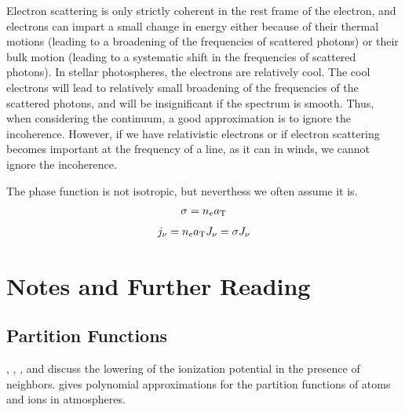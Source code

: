 Electron scattering is only strictly coherent in the rest
frame of the electron, and electrons can impart a small
change in energy either because of their thermal motions
(leading to a broadening of the frequencies of scattered
photons) or their bulk motion (leading to a systematic shift
in the frequencies of scattered photons). In stellar
photospheres, the electrons are relatively cool. The cool
electrons will lead to relatively small broadening of the
frequencies of the scattered photons, and will be
insignificant if the spectrum is smooth. Thus, when
considering the continuum, a good approximation is to ignore
the incoherence. However, if we have relativistic electrons
or if electron scattering becomes important at the frequency
of a line, as it can in winds, we cannot ignore the
incoherence.

The phase function is not isotropic, but neverthess we often assume it
is.
\begin{align}
\sigma = n_e a_\mathrm{T}
\end{align}
\begin{align}
j_\nu = n_e a_\mathrm{T} J_\nu = \sigma J_\nu
\end{align}

\section{Notes and Further Reading}

\subsection{Partition Functions}

\citet[\S5-1 and \S9-4]{Mihalas-1978}, \citet[p.\@ 62--63]{Shu-1991}, \citet[p.\@
8--10]{Shu-1992},  and\citet{Hummer-1988} discuss the lowering of the ionization potential in the presence of neighbors.
\citet[appendix D]{Gray-1992} gives polynomial approximations for the partition functions of atoms and ions in atmospheres.

